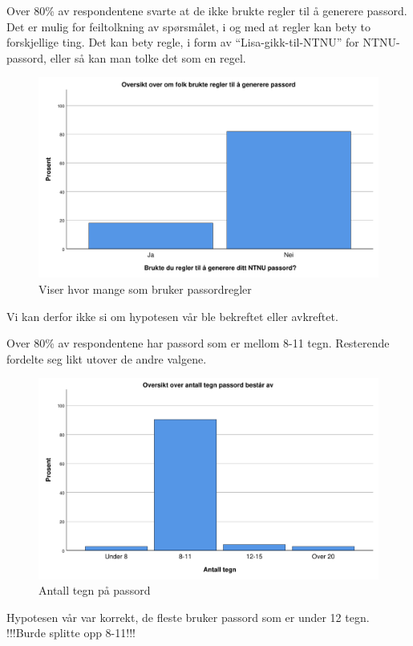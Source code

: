 Over 80\% av respondentene svarte at de ikke brukte regler til å generere passord. Det er mulig for feiltolkning av spørsmålet, i og med at regler kan bety to forskjellige ting. Det kan bety regle, i form av ``Lisa-gikk-til-NTNU'' for NTNU-passord, eller så kan man tolke det som en regel. 
\begin{figure}[H]
    \centering
    \includegraphics[scale=0.5]{case_2/bilder/spss/regler_passord.pdf}
    \caption[passordregler]{Viser hvor mange som bruker passordregler}
    \label{fig:passordregler}
\end{figure}
Vi kan derfor ikke si om hypotesen vår ble bekreftet eller avkreftet.

Over 80\% av respondentene har passord som er mellom 8-11 tegn. Resterende fordelte seg likt utover de andre valgene. 
\begin{figure}[H]
    \centering
    \includegraphics[scale=0.5]{case_2/bilder/spss/antall_tegn.pdf}
    \caption[antalltegn]{Antall tegn på passord}
    \label{fig:antalltegn}
\end{figure}
Hypotesen vår var korrekt, de fleste bruker passord som er under 12 tegn. !!!Burde splitte opp 8-11!!!

